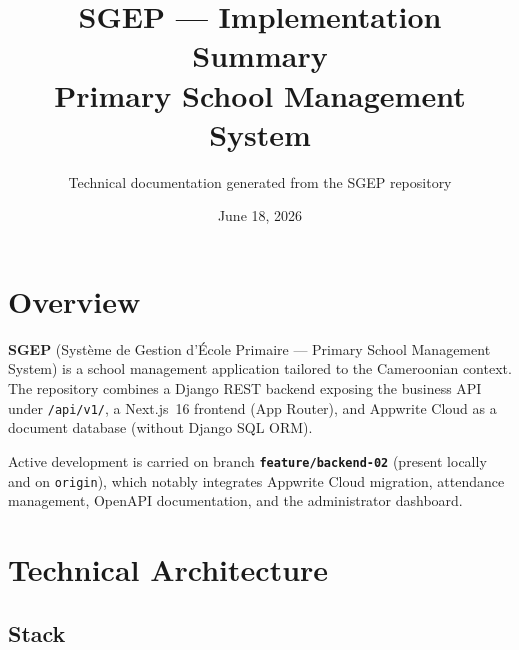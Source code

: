 \documentclass[11pt,a4paper]{article}
\title{SGEP --- Implementation Summary\\
\large Primary School Management System}
\author{Technical documentation generated from the SGEP repository}
\date{June 18, 2026}
\begin{document}
\maketitle
\tableofcontents
\newpage

\section{Overview}

\textbf{SGEP} (Système de Gestion d'École Primaire --- Primary School Management System) is a school management application tailored to the Cameroonian context. The repository combines a Django REST backend exposing the business API under \texttt{/api/v1/}, a Next.js~16 frontend (App Router), and Appwrite Cloud as a document database (without Django SQL ORM).

Active development is carried on branch \textbf{\texttt{feature/backend-02}} (present locally and on \texttt{origin}), which notably integrates Appwrite Cloud migration, attendance management, OpenAPI documentation, and the administrator dashboard.

\section{Technical Architecture}

\subsection{Stack}
\end{document}
